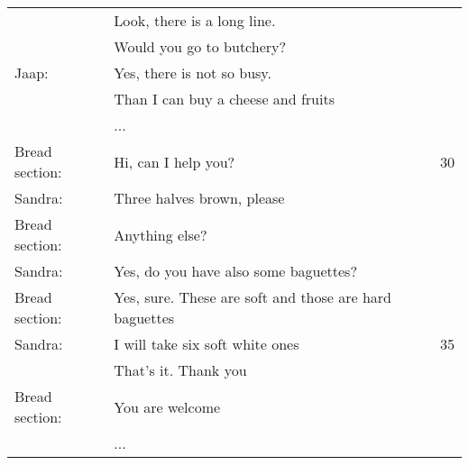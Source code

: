 \documentclass{tstextbook}
\begin{document}
\begin{definition}
\begin{tabular}{lll}
			& Look, there is a long line. &\\
			& Would you go to butchery? &\\
			Jaap: & Yes, there is not so busy. &\\
			& Than I can buy a cheese and fruits &\\
			& ... \\
			Bread section: & Hi, can I help you? & 30\\
			Sandra: & Three halves brown, please &\\
			Bread section: & Anything else? &\\
			Sandra: & Yes, do you have also some baguettes? &\\
			Bread section: & Yes, sure. These are soft and those are hard baguettes& \\
			Sandra: & I will take six soft white ones & 35\\
			& That's it. Thank you &\\
			Bread section: & You are welcome &\\
			& ... &\\
			
		\end{tabular}
	\end{definition}
			
		\newpage	
			
\end{document}
